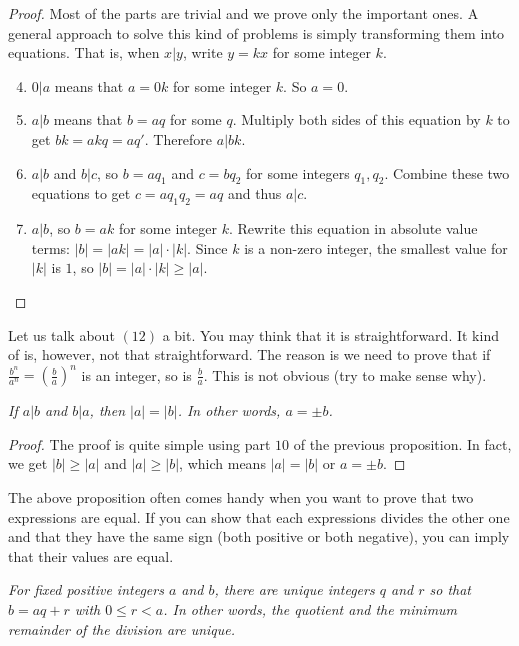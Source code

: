 \documentclass{subfile}
\begin{document}
	\begin{proof}
		Most of the parts are trivial and we prove only the important ones. A general approach to solve this kind of problems is simply transforming them into equations. That is, when $x|y$, write $y=kx$ for some integer $k$.
		\begin{enumerate}
			\setcounter{enumi}{3}
			\item $0|a$ means that $a=0k$ for some integer $k$. So $a=0$.
			\setcounter{enumi}{5}
			\item $a|b$ means that $b=aq$ for some $q$. Multiply both sides of this equation by $k$ to get $bk = akq=aq'$. Therefore $a|bk$.
			\setcounter{enumi}{8}
			\item $a|b$ and $b|c$, so $b=aq_1$ and $c=bq_2$ for some integers $q_1, q_2$. Combine these two equations to get $c = aq_1q_2 = aq$ and thus $a|c$.
			\setcounter{enumi}{9}
			\item $a|b$, so $b = ak$ for some integer $k$. Rewrite this equation in absolute value terms: $|b| = |ak| = |a| \cdot |k|$. Since $k$ is a non-zero integer, the smallest value for $|k|$ is $1$, so $|b| = |a| \cdot |k| \geq |a|$.
			\setcounter{enumi}{11}
		\end{enumerate}
	\end{proof}
	Let us talk about $(12)$ a bit. You may think that it is straightforward. It kind of is, however, not that straightforward. The reason is we need to prove that if $\frac{b^n}{a^n}=\left(\frac{b}{a}\right)^n$ is an integer, so is $\frac{b}{a}$. This is not obvious (try to make sense why).

	\begin{proposition}\slshape\label{prop:bothdivide}
		If $a|b$ and $b|a$, then  $|a|=|b|$. In other words, $a=\pm b$.
	\end{proposition}

	\begin{proof}
		The proof is quite simple using part $10$ of the previous proposition. In fact, we get $|b| \geq |a|$ and $|a| \geq |b|$, which means $|a| = |b|$ or $a = \pm b$.
	\end{proof}
	The above proposition often comes handy when you want to prove that two expressions are equal. If you can show that each expressions divides the other one and that they have the same sign (both positive or both negative), you can imply that their values are equal.

	\begin{proposition}\slshape
		For fixed positive integers $a$ and $b$, there are unique integers $q$ and $r$ so that $b=aq+r$ with $0\leq r<a$. In other words, the quotient and the minimum remainder of the division are unique.
	\end{proposition}
\end{document}
